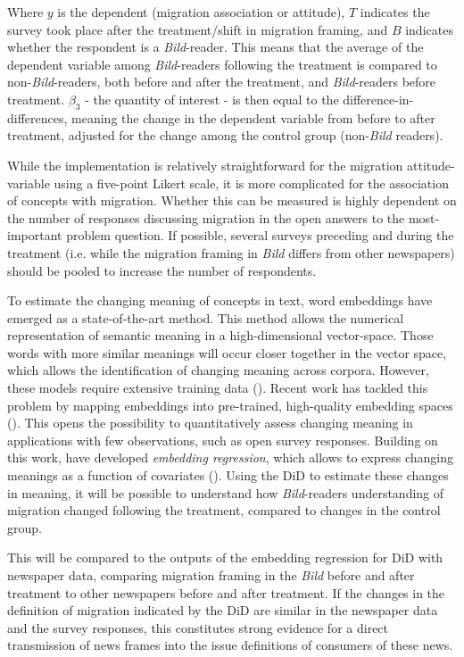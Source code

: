 \documentclass{article}
\begin{document}
Where $y$ is the dependent (migration association or attitude), $T$ indicates the survey took place after the treatment/shift in migration framing, and $B$ indicates whether the respondent is a \textit{Bild}-reader. This means that the average of the dependent variable among \textit{Bild}-readers following the treatment is compared to non-\textit{Bild}-readers, both before and after the treatment, and \textit{Bild}-readers before treatment. $\beta_3$ - the quantity of interest - is then equal to the difference-in-differences, meaning the change in the dependent variable from before to after treatment, adjusted for the change among the control group (non-\textit{Bild} readers).

While the implementation is relatively straightforward for the migration attitude-variable using a five-point Likert scale, it is more complicated for the association of concepts with migration. Whether this can be measured is highly dependent on the number of responses discussing migration in the open answers to the most-important problem question. If possible, several surveys preceding and during the treatment (i.e. while the migration framing in \textit{Bild} differs from other newspapers) should be pooled to increase the number of respondents. 

To estimate the changing meaning of concepts in text, word embeddings have emerged as a state-of-the-art method. This method allows the numerical representation of semantic meaning in a high-dimensional vector-space. Those words with more similar meanings will occur closer together in the vector space, which allows the identification of changing meaning across corpora. However, these models require extensive training data (\cite{Rodman2019}). Recent work has tackled this problem by mapping embeddings into pre-trained, high-quality embedding spaces (\cite{Khodak2018}). This opens the possibility to quantitatively assess changing meaning in applications with few observations, such as open survey responses. Building on this work, \citeauthor{Rodriguez2020} have developed \textit{embedding regression}, which allows to express changing meanings as a function of covariates (\citeyear{Rodriguez2020}). Using the DiD to estimate these changes in meaning, it will be possible to understand how \textit{Bild}-readers understanding of migration changed following the treatment, compared to changes in the control group.

This will be compared to the outputs of the embedding regression for DiD with newspaper data, comparing migration framing in the \textit{Bild} before and after treatment to other newspapers before and after treatment. If the changes in the definition of migration indicated by the DiD are similar in the newspaper data and the survey responses, this constitutes strong evidence for a direct transmission of news frames into the issue definitions of consumers of these news.

\end{document}
